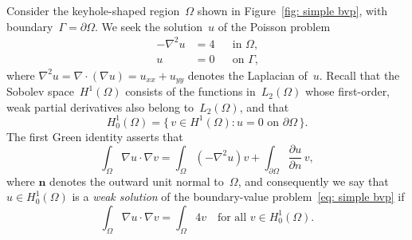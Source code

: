 \documentclass[a4paper,12pt]{article}
\begin{document}
Consider the keyhole-shaped region~$\Omega$ shown in 
Figure~\ref{fig: simple bvp}, with boundary~$\Gamma=\partial\Omega$.  
We seek the solution~$u$ of the Poisson problem
\begin{equation}\label{eq:  simple bvp}
\begin{aligned}
-\nabla^2 u&=4&&\text{in $\Omega$,}\\
u&=0&&\text{on $\Gamma$,}
\end{aligned}
\end{equation}
where $\nabla^2u=\nabla\cdot(\nabla u)=u_{xx}+u_{yy}$ denotes the 
Laplacian of~$u$. Recall that the Sobolev space~$H^1(\Omega)$ 
consists of the functions in~$L_2(\Omega)$ whose first-order, weak 
partial derivatives also belong to~$L_2(\Omega)$, and that 
\[
H^1_0(\Omega)=\{\,v\in H^1(\Omega):\text{$u=0$ on~$\partial\Omega$}
	\,\}.
\]
The first Green identity asserts that
\[
\int_\Omega\nabla u\cdot\nabla v=\int_\Omega(-\nabla^2 u)v
	+\int_{\partial\Omega}\frac{\partial u}{\partial n}\,v,
\]
where $\boldsymbol{n}$ denotes the outward unit normal to~$\Omega$,
and consequently we say that $u\in H^1_0(\Omega)$ is a \emph{weak 
solution} of the boundary-value problem~\eqref{eq:  simple bvp} if
\begin{equation}\label{eq: weak bvp}
\int_\Omega\nabla u\cdot\nabla v=\int_\Omega 4v
	\quad\text{for all $v\in H^1_0(\Omega)$.}
\end{equation}
\end{document}
